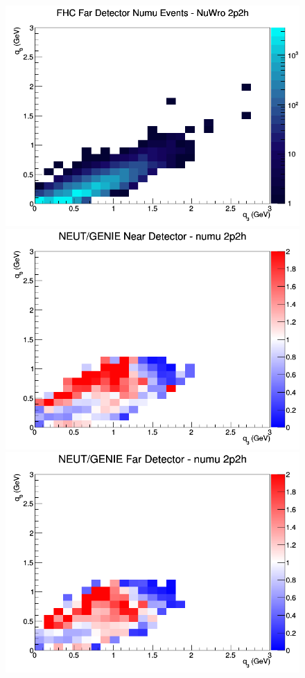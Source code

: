\documentclass[12pt]{article}
\begin{document}
\begin{figure}[h]
\endminipage
{}
\includegraphics[width=\linewidth]{eff_q0_q3/GAr/2p2h_FHC_FD_numu_q3_q0_NuWro.png}
\endminipage
\newline
{}
\includegraphics[width=\linewidth]{eff_q0_q3/GAr/ratios/2p2h_NEUT_GENIE_numu_near_q3_q0.png}
\endminipage
{}
\includegraphics[width=\linewidth]{eff_q0_q3/GAr/ratios/2p2h_NEUT_GENIE_numu_far_q3_q0.png}

\end{figure}
\end{document}
